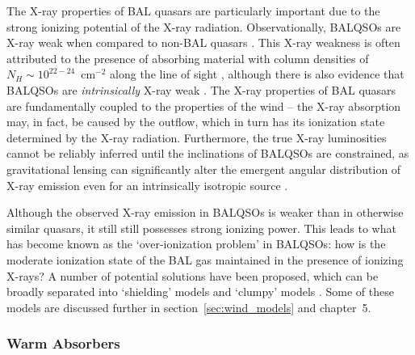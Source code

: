 The X-ray properties of BAL quasars are particularly important due
to the strong ionizing potential of the X-ray radiation. 
Observationally, BALQSOs are X-ray weak when compared to 
non-BAL quasars \citep{gibson2009}. 
This X-ray weakness is often attributed to the presence of absorbing material
with column densities of $N_H \sim 10^{22-24}$~cm$^{-2}$ along the line of sight
\citep{gallagher1999,gallagher2002,green2001,grupe2003,stalin2011},
although there is also evidence that BALQSOs are {\em intrinsically}
X-ray weak \citep{sabra2001,clavel2006,morabito2013}.
The X-ray properties of BAL quasars are fundamentally coupled to 
the properties of the wind -- the X-ray absorption may, in fact, be caused by 
the outflow, which in turn has its ionization state 
determined by the X-ray radiation. Furthermore, the true X-ray 
luminosities cannot be reliably inferred until the 
inclinations of BALQSOs are
constrained, as gravitational lensing can significantly alter the
emergent angular distribution of X-ray emission even for an intrinsically
isotropic source \citep{chen2013a, chen2013b}.

Although the observed X-ray emission in BALQSOs is weaker than in otherwise similar
quasars, it still still possesses strong ionizing power. This leads to what has become
known as the `over-ionization problem' in BALQSOs: how is the moderate 
ionization state of the BAL gas maintained in the presence of ionizing 
X-rays? A number of potential solutions have been proposed, which can be 
broadly separated into `shielding' models \citep{MCGV95,PK04} and `clumpy'
models \citep{dekool1995,hamann2013}. Some of these models are discussed
further in section~\ref{sec:wind_models} and chapter~5.

\subsubsection{Warm Absorbers}


